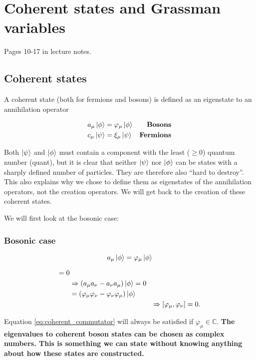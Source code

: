 \section{Coherent states and Grassman variables}
Pages 10-17 in lecture notes.

\subsection{Coherent states}
A coherent state (both for fermions and bosons) is defined as an eigenstate to an annihilation operator

\begin{align}
	a_\mu \ket{\phi} &= \varphi_\mu \ket{\phi} & \textbf{Bosons}\\
	c_\mu \ket{\psi} &= \xi_\mu\ket{\psi} & \textbf{Fermions}
\end{align}

Both $\ket{\psi}$ and $\ket{\phi}$ must contain a component with the least ($\ge 0$) quantum number (quant), but it is clear that neither $\ket{\psi}$ nor $\ket{\phi}$ can be states with a sharply defined number of particles. They are therefore also ``hard to destroy''. This also explains why we chose to define them as eigenstates of the annihilation operators, not the creation operators. We will get back to the creation of these coherent states. 

We will first look at the bosonic case:
\subsubsection{Bosonic case}

\begin{equation}
a_\mu\ket{\phi} = \varphi_\mu\ket{\phi}
\end{equation}

\begin{align}
[a_\mu, a_{\nu}] = 0& &\nonumber \\
 &\Rightarrow \left(a_\mu a_{\nu} -a_{\nu}a_\mu\right)\ket{\phi} = 0 & \nonumber \\
&= \left(\varphi_\mu\varphi_{\nu} - \varphi_{\nu}\varphi_\mu\right)\ket{\phi} &\nonumber\\
&&\Rightarrow [\varphi_\mu, \varphi_\nu] = 0. \label{eq:coherent_commutator} 
\end{align}

Equation \eqref{eq:coherent_commutator} will always be satisfied if $\varphi_\mu \in \mathbb{C}$. \textbf{The eigenvalues to coherent boson states can be chosen as complex numbers. This is something we can state without knowing anything about how these states are constructed. }

